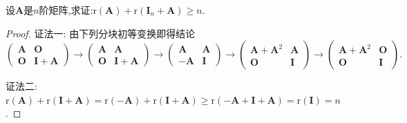 \documentclass[../../main.tex]{subfiles}%
\begin{document}
\begin{example}
设\(\boldsymbol{A}\)是\(n\)阶矩阵,求证:\(\mathrm{r}(\boldsymbol{A})+\mathrm{r}(\boldsymbol{I}_n+\boldsymbol{A})\geqslant  n\).
\end{example}
\begin{proof}

{\color{blue}证法一:}
由下列分块初等变换即得结论
\[
\begin{pmatrix}
\boldsymbol{A}&\boldsymbol{O}\\
\boldsymbol{O}&\boldsymbol{I}+\boldsymbol{A}
\end{pmatrix}\to
\begin{pmatrix}
\boldsymbol{A}&\boldsymbol{A}\\
\boldsymbol{O}&\boldsymbol{I}+\boldsymbol{A}
\end{pmatrix}\to
\begin{pmatrix}
\boldsymbol{A}&\boldsymbol{A}\\
-\boldsymbol{A}&\boldsymbol{I}
\end{pmatrix}\to
\begin{pmatrix}
\boldsymbol{A}+\boldsymbol{A}^2&\boldsymbol{A}\\
\boldsymbol{O}&\boldsymbol{I}
\end{pmatrix}\to
\begin{pmatrix}
\boldsymbol{A}+\boldsymbol{A}^2&\boldsymbol{O}\\
\boldsymbol{O}&\boldsymbol{I}
\end{pmatrix}.
\]

{\color{blue}证法二:}
\(\mathrm{r}(\boldsymbol{A})+\mathrm{r}(\boldsymbol{I}+\boldsymbol{A})=\mathrm{r}(-\boldsymbol{A})+\mathrm{r}(\boldsymbol{I}+\boldsymbol{A})\geqslant \mathrm{r}(-\boldsymbol{A}+\boldsymbol{I}+\boldsymbol{A})=\mathrm{r}(\boldsymbol{I}) = n\).

\end{proof}
\end{document}
